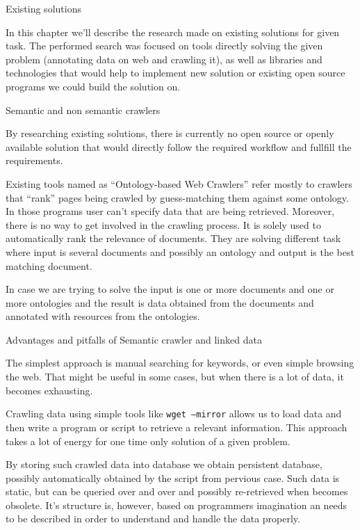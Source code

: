 
\chap Existing solutions

In this chapter we'll describe the research made on existing solutions for
given task. The performed search was focused on tools directly solving the 
given problem (annotating data on web and crawling it), as well as libraries
and technologies that would help to implement new solution or existing open 
source programs we could build the solution on. 


\sec Semantic and non semantic crawlers

By researching existing solutions, there is currently no open source or openly
available solution that would directly follow the required workflow and
fullfill the requirements. 

Existing tools named as ``Ontology-based Web Crawlers'' refer mostly to crawlers
that ``rank'' pages being crawled by guess-matching them against some ontology.
In those programs user can't specify data that are being retrieved. Moreover,
there is no way to get involved in the crawling process. It is solely used to
automatically rank the relevance of documents. They are solving different task
where input is several documents and possibly an ontology and output is the
best matching document. 

In case we are trying to solve the input is one or more documents and one or
more ontologies and the result is data obtained from the documents and
annotated with resources from the ontologies. 


\sec Advantages and pitfalls of Semantic crawler and linked data

The simplest approach is manual searching for keywords, or even simple browsing
the web. That might be useful in some cases, but when there is a lot of data,
it becomes exhausting. 

Crawling data using simple tools like {\tt wget --mirror} allows us to load data
and then write a program or script to retrieve a relevant information. This
approach takes a lot of energy for one time only solution of a given problem. 

By storing such crawled data into database we obtain persistent database,
possibly automatically obtained by the script from pervious case. Such data is
static, but can be queried over and over and possibly re-retrieved when becomes
obsolete. It's structure is, however, based on programmers imagination an
needs to be described in order to understand and handle the data properly. 

